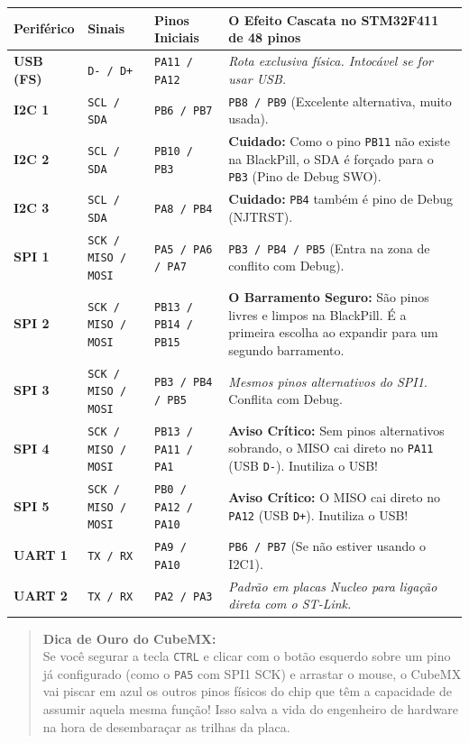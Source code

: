 \documentclass[12pt,a4paper]{article}
\begin{document}
\begin{table}[H]
    \centering
    \begin{tabular}{llp{3cm}p{7cm}}
    \toprule
    \textbf{Periférico} & \textbf{Sinais} & \textbf{Pinos Iniciais} & \textbf{O Efeito Cascata no STM32F411 de 48 pinos} \\
    \midrule
    \textbf{USB (FS)} & \texttt{D- / D+} & \texttt{PA11 / PA12} & \textit{Rota exclusiva física. Intocável se for usar USB.} \\
    \midrule
    \textbf{I2C 1} & \texttt{SCL / SDA} & \texttt{PB6 / PB7} & \texttt{PB8 / PB9} (Excelente alternativa, muito usada). \\
    \textbf{I2C 2} & \texttt{SCL / SDA} & \texttt{PB10 / PB3} & \textbf{Cuidado:} Como o pino \texttt{PB11} não existe na BlackPill, o SDA é forçado para o \texttt{PB3} (Pino de Debug SWO). \\
    \textbf{I2C 3} & \texttt{SCL / SDA} & \texttt{PA8 / PB4} & \textbf{Cuidado:} \texttt{PB4} também é pino de Debug (NJTRST). \\
    \midrule
    \textbf{SPI 1} & \texttt{SCK / MISO / MOSI} & \texttt{PA5 / PA6 / PA7} & \texttt{PB3 / PB4 / PB5} (Entra na zona de conflito com Debug). \\
    \textbf{SPI 2} & \texttt{SCK / MISO / MOSI} & \texttt{PB13 / PB14 / PB15} & \textbf{O Barramento Seguro:} São pinos livres e limpos na BlackPill. É a primeira escolha ao expandir para um segundo barramento. \\
    \textbf{SPI 3} & \texttt{SCK / MISO / MOSI} & \texttt{PB3 / PB4 / PB5} & \textit{Mesmos pinos alternativos do SPI1}. Conflita com Debug. \\
    \textbf{SPI 4} & \texttt{SCK / MISO / MOSI} & \texttt{PB13 / PA11 / PA1} & \textbf{Aviso Crítico:} Sem pinos alternativos sobrando, o MISO cai direto no \texttt{PA11} (USB \texttt{D-}). Inutiliza o USB! \\
    \textbf{SPI 5} & \texttt{SCK / MISO / MOSI} & \texttt{PB0 / PA12 / PA10} & \textbf{Aviso Crítico:} O MISO cai direto no \texttt{PA12} (USB \texttt{D+}). Inutiliza o USB! \\
    \midrule
    \textbf{UART 1} & \texttt{TX / RX} & \texttt{PA9 / PA10} & \texttt{PB6 / PB7} (Se não estiver usando o I2C1). \\
    \textbf{UART 2} & \texttt{TX / RX} & \texttt{PA2 / PA3} & \textit{Padrão em placas Nucleo para ligação direta com o ST-Link.} \\
    \bottomrule
    \end{tabular}
\end{table}

\begin{quote}
\textbf{Dica de Ouro do CubeMX:} \\
Se você segurar a tecla \texttt{CTRL} e clicar com o botão esquerdo sobre um pino já configurado (como o \texttt{PA5} com SPI1 SCK) e arrastar o mouse, o CubeMX vai piscar em azul os outros pinos físicos do chip que têm a capacidade de assumir aquela mesma função! Isso salva a vida do engenheiro de hardware na hora de desembaraçar as trilhas da placa.
\end{quote}
\end{document}
